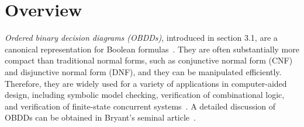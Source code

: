 \section{Overview}
\label{sec:OBDDs}

{\it Ordered binary decision diagrams (OBDDs)}, introduced in section 3.1, are a canonical 
representation for Boolean formulas~\cite{Bryant:BDD}. They are often
substantially more compact than traditional normal forms, such as
conjunctive normal form (CNF) and disjunctive normal form (DNF), and
they can be manipulated efficiently. Therefore, they are widely used for a
variety of applications in computer-aided design, including symbolic
model checking, verification of combinational logic, and verification of
finite-state concurrent systems~\cite{Clarke:book}.  A detailed
discussion of OBDDs can be obtained in Bryant's seminal
article~\cite{Bryant:BDD}.


